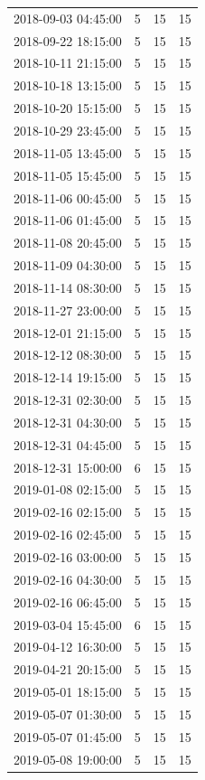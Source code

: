 \begin{tabular}{lrrr}
2018-09-03 04:45:00 & 5 & 15 & 15 \\
2018-09-22 18:15:00 & 5 & 15 & 15 \\
2018-10-11 21:15:00 & 5 & 15 & 15 \\
2018-10-18 13:15:00 & 5 & 15 & 15 \\
2018-10-20 15:15:00 & 5 & 15 & 15 \\
2018-10-29 23:45:00 & 5 & 15 & 15 \\
2018-11-05 13:45:00 & 5 & 15 & 15 \\
2018-11-05 15:45:00 & 5 & 15 & 15 \\
2018-11-06 00:45:00 & 5 & 15 & 15 \\
2018-11-06 01:45:00 & 5 & 15 & 15 \\
2018-11-08 20:45:00 & 5 & 15 & 15 \\
2018-11-09 04:30:00 & 5 & 15 & 15 \\
2018-11-14 08:30:00 & 5 & 15 & 15 \\
2018-11-27 23:00:00 & 5 & 15 & 15 \\
2018-12-01 21:15:00 & 5 & 15 & 15 \\
2018-12-12 08:30:00 & 5 & 15 & 15 \\
2018-12-14 19:15:00 & 5 & 15 & 15 \\
2018-12-31 02:30:00 & 5 & 15 & 15 \\
2018-12-31 04:30:00 & 5 & 15 & 15 \\
2018-12-31 04:45:00 & 5 & 15 & 15 \\
2018-12-31 15:00:00 & 6 & 15 & 15 \\
2019-01-08 02:15:00 & 5 & 15 & 15 \\
2019-02-16 02:15:00 & 5 & 15 & 15 \\
2019-02-16 02:45:00 & 5 & 15 & 15 \\
2019-02-16 03:00:00 & 5 & 15 & 15 \\
2019-02-16 04:30:00 & 5 & 15 & 15 \\
2019-02-16 06:45:00 & 5 & 15 & 15 \\
2019-03-04 15:45:00 & 6 & 15 & 15 \\
2019-04-12 16:30:00 & 5 & 15 & 15 \\
2019-04-21 20:15:00 & 5 & 15 & 15 \\
2019-05-01 18:15:00 & 5 & 15 & 15 \\
2019-05-07 01:30:00 & 5 & 15 & 15 \\
2019-05-07 01:45:00 & 5 & 15 & 15 \\
2019-05-08 19:00:00 & 5 & 15 & 15 \\

\end{tabular}
